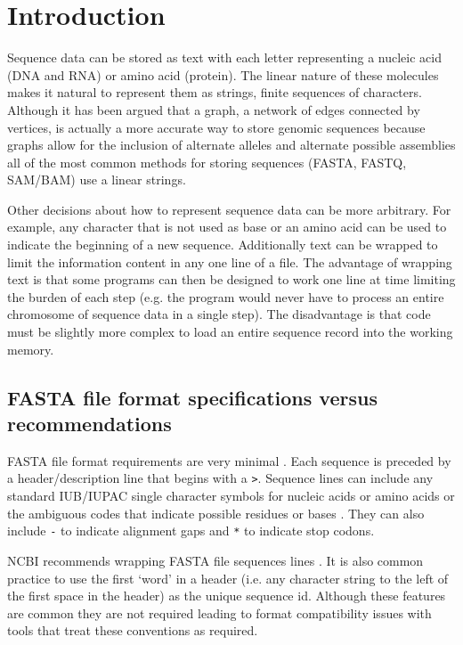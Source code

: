\section{Introduction}

Sequence data can be stored as text with each letter representing a nucleic acid (DNA and RNA) or amino acid (protein). The linear nature of these molecules makes it natural to represent them as strings, finite sequences of characters. Although it has been argued that a graph, a network of edges connected by vertices, is actually a more accurate way to store genomic sequences because graphs allow for the inclusion of alternate alleles and alternate possible assemblies \cite{jaffe2012fastg} all of the most common methods for storing sequences (FASTA, FASTQ, SAM/BAM) use a linear strings.

Other decisions about how to represent sequence data can be more arbitrary. For example, any character that is not used as base or an amino acid can be used to indicate the beginning of a new sequence. Additionally text can be wrapped to limit the information content in any one line of a file. The advantage of wrapping text is that some programs can then be designed to work one line at time limiting the burden of each step (e.g. the program would never have to process an entire chromosome of sequence data in a single step). The disadvantage is that code must be slightly more complex to load an entire sequence record into the working memory.

\subsection{FASTA file format specifications versus recommendations}

FASTA file format requirements are very minimal \cite{FASTAformat}. Each sequence is preceded by a header/description line that begins with a \verb|>|. Sequence lines can include any standard IUB/IUPAC single character symbols for nucleic acids or amino acids or the ambiguous codes that indicate possible residues or bases \cite{comm1970abbreviations}. They can also include \verb|-| to indicate alignment gaps and \verb|*| to indicate stop codons. 

NCBI recommends wrapping FASTA file sequences lines \cite{FASTAformat}. It is also common practice to use the first `word' in a header (i.e. any character string to the left of the first space in the header) as the unique sequence id. Although these features are common they are not required leading to format compatibility issues with tools that treat these conventions as required.

